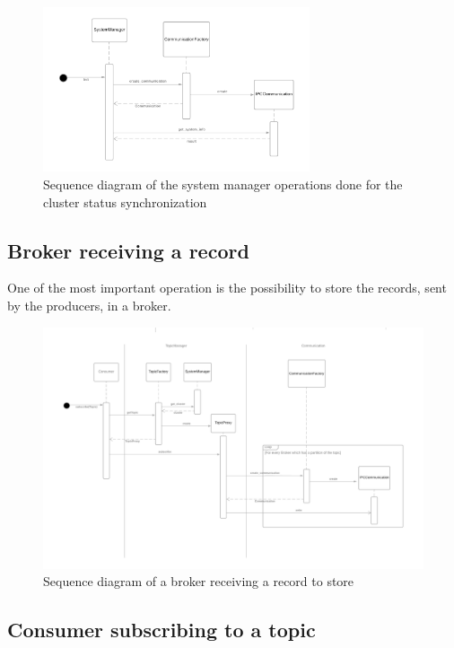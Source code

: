 \begin{figure}[H]
    \centering
    \includegraphics[width=0.7\textwidth]{Figures/sequence_diagram_cluster_status_system_manager.png}
    \caption{Sequence diagram of the system manager operations done for the
             cluster status synchronization}
\end{figure}

\subsection{Broker receiving a record}

One of the most important operation is the possibility to store the records,
sent by the producers, in a broker. 

\begin{figure}[H]
    \centering
    \includegraphics[width=1.0\textwidth]{Figures/sequence_diagram_broker.png}
    \caption{Sequence diagram of a broker receiving a record to store}
\end{figure}

\subsection{Consumer subscribing to a topic}

